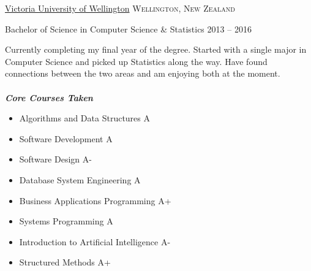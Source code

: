 \documentclass[10pt,a4paper]{article}
\begin{document}
\headedsection
  {\href{http://www.victoria.ac.nz/}{Victoria University of Wellington}}
  {\textsc{Wellington, New Zealand}} {
  \headedsubsection
    {Bachelor of Science in Computer Science \& Statistics}
    {2013 -- 2016}
    {\bodytext
      {
        Currently completing my final year of the degree.
        Started with a single major in Computer Science and picked up Statistics along the way.
        Have found connections between the two areas and am enjoying both at the moment.\\\\
        \emph{\textbf{Core Courses Taken}}
        \begin{multicols}{2}
          \begin{itemize}
            \item Algorithms and Data Structures\hspace*{1cm} A
            \item Software Development\hspace*{2.4cm} A
            \item Software Design\hspace*{3.4cm} A-
            \item Database System Engineering\hspace*{1.35cm} A
            \item Business Applications Programming\hspace*{.4cm} A+
            \item Systems Programming\hspace*{2.57cm} A
            \item Introduction to Artificial Intelligence\hspace*{.4cm} A-
            \item Structured Methods\hspace*{3cm} A+
          \end{itemize}
        \end{multicols}
      }
    }
  }

\makeatletter
\renewcommand{\@seccntformat}[1]{{\csname the#1\endcsname}.\hspace{0.5em}} 

\long{}
\renewcommand{\table}{\let\@makecaption\@maketblcaption\@float{table}}
\makeatother
\end{document}
